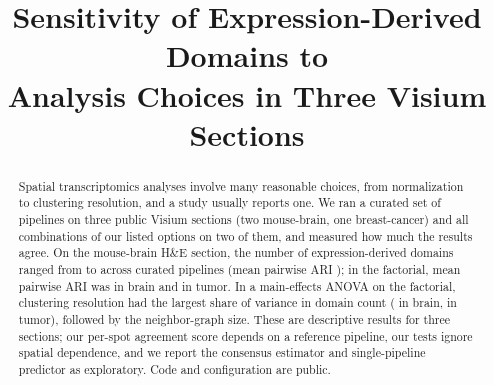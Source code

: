 \documentclass[conference]{IEEEtran}
\begin{document}
\title{Sensitivity of Expression-Derived Domains to\\
Analysis Choices in Three Visium Sections}

\author{
}

\maketitle

\begin{abstract}
Spatial transcriptomics analyses involve many reasonable choices, from
normalization to clustering resolution, and a study usually reports one.
We ran a curated set of \Nspecs{} pipelines on three public Visium
sections (two mouse-brain, one breast-cancer) and all \FullNspecs{}
combinations of our listed options on two of them, and measured how much
the results agree. On the
mouse-brain H\&E section, the number of expression-derived domains ranged from
\ClustMin{} to \ClustMax{} across curated pipelines (mean pairwise ARI
\AriMean{}); in the factorial, mean pairwise ARI was \FullAriHne{} in brain
and \FullAriBreast{} in tumor. In a main-effects ANOVA on the factorial,
clustering resolution had the largest share of variance in domain count
(\FullHneRes{} in brain, \FullBreastRes{} in tumor), followed by the
neighbor-graph size. These are descriptive results for three sections;
our per-spot agreement score depends on a reference pipeline, our tests
ignore spatial dependence, and we report the consensus estimator and
single-pipeline predictor as exploratory. Code
and configuration are public.
\end{abstract}
\end{document}
